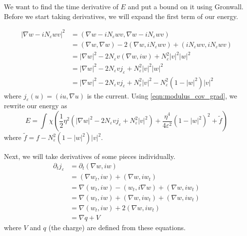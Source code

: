 \documentclass[a4paper]{article}
\begin{document}
We want to find the time derivative of $E$ and put a bound on it using Gronwall.
Before we start taking derivatives, we will expand the first term of our energy.

\begin{align}
  |\nabla w - iN_\varepsilon w v|^2 &= ( \nabla w - iN_\varepsilon w v , \nabla w - iN_\varepsilon w v ) \nonumber \\
  &= (\nabla w, \nabla w ) - 2 ( \nabla w, iN_\varepsilon w v ) + ( i N_\varepsilon w v, i N_\varepsilon w v ) \nonumber \\
  &= | \nabla w |^2 - 2 N_\varepsilon v ( \nabla w, iw ) + N_\varepsilon^2 |v|^2 |w|^2 \nonumber \\
  &= | \nabla w |^2 - 2 N_\varepsilon v j_\varepsilon + N_\varepsilon^2 |v|^2 |w|^2 \nonumber \\
  &= | \nabla w |^2 - 2 N_\varepsilon v j_\varepsilon + N_\varepsilon^2 |v|^2 - N_\varepsilon^2 ( 1 - |w|^2 )|v|^2
  \label{eqn:modulus_cov_grad}
\end{align}
where $j_\varepsilon(u) = (iu, \nabla u)$ is the current.
Using \eqref{eqn:modulus_cov_grad}, we rewrite our energy as
\begin{equation} \label{eqn:energy_form}
  E = \int_{}^{} \chi \left( \frac{1}{2} \eta^2 \left( | \nabla w |^2 - 2 N_\varepsilon v j_\varepsilon + N_\varepsilon^2 |v|^2
  \right) + \frac{\eta^4}{4 \varepsilon^2} ( 1 - |w|^2)^2 + \tilde{f} \right)
\end{equation}
where $\tilde{f} = f - N_\varepsilon^2 (1 - |w|^2) |v|^2$.

Next, we will take derivatives of some pieces individually.
\begin{align} \label{eqn:current_deriv}
  \partial_t j_\varepsilon &= \partial_t (\nabla w, iw) \nonumber \\
  &= ( \nabla w_t, iw ) + ( \nabla w, i w_t) \nonumber \\
  &= \nabla( w_t, iw) - (w_t, i \nabla w) + ( \nabla w, i w_t) \nonumber \\
  &= \nabla( w_t, iw) + (\nabla w, i w_t) + ( \nabla w, i w_t) \nonumber \\
  &= \nabla( w_t, iw) + 2(\nabla w, i w_t) \\
  &= \nabla q + V \nonumber
\end{align}
where $V$ and $q$ (the charge) are defined from these equations.
\end{document}
